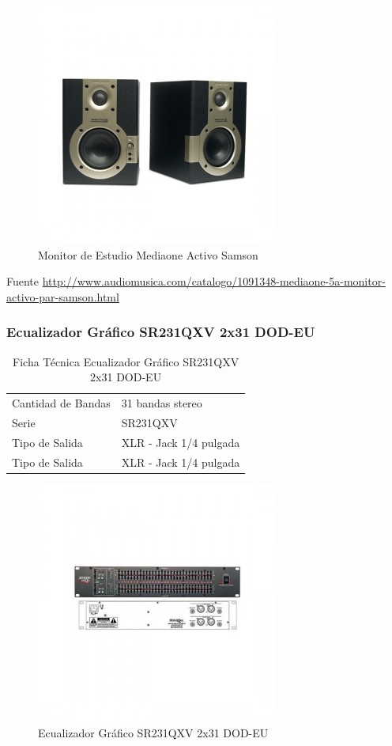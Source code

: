 \begin{figure}[h!t]
   \centering
  \includegraphics[scale=0.3]{img/monitor.jpg}
   \caption{Monitor de Estudio Mediaone Activo Samson}
   \label{fig:monitor}
\end{figure}

Fuente \url{http://www.audiomusica.com/catalogo/1091348-mediaone-5a-monitor-activo-par-samson.html}

\subsubsection*{Ecualizador Gráfico SR231QXV 2x31 DOD-EU}

\begin{table}[htb!]
\centering
\begin{tabular}{|l|l|}
\hline
Cantidad de Bandas & 31 bandas stereo \\
Serie & SR231QXV \\
Tipo de Salida & XLR - Jack 1/4 pulgada \\
Tipo de Salida & XLR - Jack 1/4 pulgada \\
\hline
\end{tabular}
\caption{Ficha Técnica Ecualizador Gráfico SR231QXV 2x31 DOD-EU}
\end{table}

\begin{figure}[h!t]
   \centering
  \includegraphics[scale=0.3]{img/ecu.jpg}
   \caption{Ecualizador Gráfico SR231QXV 2x31 DOD-EU}
   \label{fig:ecu}
\end{figure}

